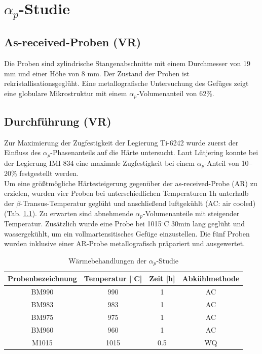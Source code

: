 \chapter{$\alpha_p$-Studie}

\section{As-received-Proben (VR)}

Die Proben sind zylindrische Stangenabschnitte mit einem Durchmesser von 19 mm und einer Höhe von 8 mm. Der Zustand der Proben ist rekristallisationsgeglüht. Eine metallografische Untersuchung des Gefüges zeigt eine globulare Mikrostruktur mit einem $\alpha_p$-Volumenanteil von 62\%. 


\section{Durchführung (VR)}

Zur Maximierung der Zugfestigkeit der Legierung Ti-6242 wurde zuerst der Einfluss des $\alpha_p$-Phasenanteils auf die Härte untersucht. Laut Lütjering \cite{Lutjering.2007} konnte bei der Legierung IMI 834 eine maximale Zugfestigkeit bei einem $\alpha_p$-Anteil von 10--20\% festgestellt werden. \\
Um eine größtmögliche Härtesteigerung gegenüber der as-received-Probe (AR) zu erzielen, wurden vier Proben bei unterschiedlichen Temperaturen 1h unterhalb der $\beta$-Transus-Temperatur geglüht und anschließend luftgekühlt (AC: air cooled) (Tab. \ref{tab:alphap}). Zu erwarten sind abnehmende $\alpha_p$-Volumenanteile mit steigender Temperatur. Zusätzlich wurde eine Probe bei 1015$^\circ$C 30min lang geglüht und wassergekühlt, um ein vollmartensitisches Gefüge einzustellen. Die fünf Proben wurden inklusive einer AR-Probe metallografisch präpariert und ausgewertet.



\begin{table}[h]
	\centering
	\begin{tabular}{|c|c|c|c|}
		\hline 
		Probenbezeichnung & Temperatur [$^\circ$C] & Zeit [h] & Abkühlmethode \\ 
		\hline 
		BM990 & 990 & 1 & AC\\ 
		\hline 
		BM983 & 983 & 1 & AC\\
		\hline
		BM975 & 975 & 1 & AC\\ 
		\hline
		BM960 & 960 & 1 & AC\\ 
		\hline 
		M1015 & 1015 & 0.5 & WQ\\ 
		\hline
	\end{tabular} 
	\caption{Wärmebehandlungen der $\alpha_p$-Studie}
	\label{tab:alphap}
\end{table}



